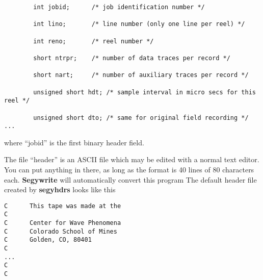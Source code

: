 {{{{\begin{verbatim}
        int jobid;      /* job identification number */

        int lino;       /* line number (only one line per reel) */

        int reno;       /* reel number */

        short ntrpr;    /* number of data traces per record */

        short nart;     /* number of auxiliary traces per record */

        unsigned short hdt; /* sample interval in micro secs for this reel */

        unsigned short dto; /* same for original field recording */   
...
\end{verbatim}}\noindent
where ``jobid'' is the first binary header field.

The file ``header'' is an ASCII file which may be edited with a
normal text editor. You can put anything in there, as long as the
format is 40 lines of 80 characters each. {\bf Segywrite\/} will
automatically convert this program 
The default header file created by {\bf segyhdrs\/} looks like this
{\small\begin{verbatim}
C      This tape was made at the                                               
C                                                                              
C      Center for Wave Phenomena                                               
C      Colorado School of Mines                                                
C      Golden, CO, 80401                                                       
C                                                                              
...                                                                              
C                                                                              
C                                                                              
\end{verbatim}}\noindent

}}}

